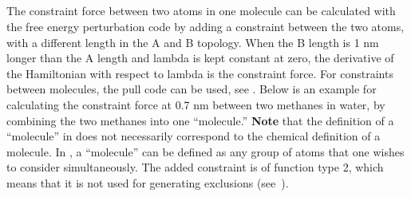 \subsection{}
\label{subsec:constraintforce}
The constraint force between two atoms in one molecule can be calculated
with the free energy perturbation code by adding a constraint between the
two atoms, with a different length in the A and B topology. When the B length
is 1 nm longer than the A length and lambda is kept constant at zero,
the derivative of the Hamiltonian with respect to lambda is the constraint
force. For constraints between molecules, the pull code can be used,
see .
Below is an example for calculating the constraint force at 0.7 nm
between two methanes in water, by combining the two methanes into one ``molecule.''
{\bf Note} that the definition of a ``molecule'' in {\gromacs} does not necessarily
correspond to the chemical definition of a molecule.  In {\gromacs}, a ``molecule''
can be defined as any group of atoms that one wishes to consider simultaneously.
The added constraint is of function type 2, which means that it is not
used for generating exclusions (see~).

